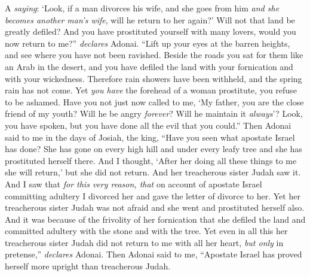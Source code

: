 \begin{biblechapter} %
\verse A \textit{saying}: ‘Look, if a man divorces his wife, 
and she goes from him \textit{and she becomes another man’s wife}, 
will he return to her again?’ 
Will not that land be greatly defiled? 
And you have prostituted yourself with many lovers, 
would you now return to me?” \textit{declares} Adonai.
\verse “Lift up your eyes at the barren heights, 
and see where you have not been ravished. 
Beside the roads you sat for them like an Arab in the desert, 
and you have defiled the land 
with your fornication 
and with your wickedness.
\verse Therefore rain showers have been withheld, 
and the spring rain has not come. 
Yet \textit{you have} the forehead of a woman prostitute, 
you refuse to be ashamed.
\verse Have you not just now called to me, 
‘My father, you are the close friend of my youth?
\verse Will he be angry \textit{forever}? 
Will he maintain it \textit{always}’? 
Look, you have spoken, 
but you have done all the evil that you could.”
 Then Adonai said to me in the days of Josiah, the king, “Have you seen what apostate Israel has done? She has gone on every high hill and under every leafy tree and she has prostituted herself there.
\verse And I thought, ‘After her doing all these things to me she will return,’ but she did not return. And her treacherous sister Judah saw it.
\verse And I saw that \textit{for this very reason, that} on account of apostate Israel committing adultery I divorced her and gave the letter of divorce to her. Yet her treacherous sister Judah was not afraid and she went and prostituted herself also.
\verse And it was because of the frivolity of her fornication that she defiled the land and committed adultery with the stone and with the tree.
\verse Yet even in all this her treacherous sister Judah did not return to me with all her heart, \textit{but only} in pretense,” \textit{declares} Adonai.
 Then Adonai said to me, “Apostate Israel has proved herself more upright than treacherous Judah.

\end{biblechapter}
